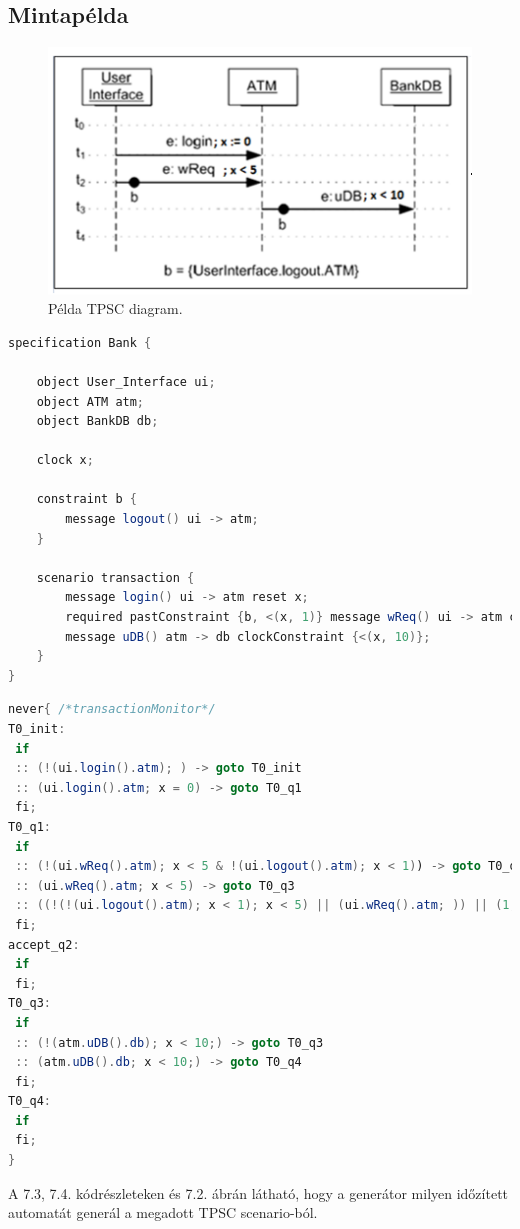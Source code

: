 \subsection{Mintapélda}

\begin{figure}[h!]
    \centering
    \includegraphics[width=130mm, keepaspectratio]{figures/14abra.png}
    \caption{Példa TPSC diagram.}
\end{figure}

\begin{lstlisting}[language=java,frame=single, float=h!, caption={TPSC scenario szöveges leírása.},captionpos=b]
specification Bank {

	object User_Interface ui;
	object ATM atm;
	object BankDB db;

	clock x;

	constraint b {
		message logout() ui -> atm;
	}

	scenario transaction {
		message login() ui -> atm reset x;
		required pastConstraint {b, <(x, 1)} message wReq() ui -> atm clockConstraint {<(x, 5)};
		message uDB() atm -> db clockConstraint {<(x, 10)};
	}
}
\end{lstlisting}

\begin{lstlisting}[language=java,frame=single, float=h!, caption={Generált időzített automata never claim formátumban.},captionpos=b]
never{ /*transactionMonitor*/
T0_init:
 if
 :: (!(ui.login().atm); ) -> goto T0_init
 :: (ui.login().atm; x = 0) -> goto T0_q1
 fi;
T0_q1:
 if
 :: (!(ui.wReq().atm); x < 5 & !(ui.logout().atm); x < 1)) -> goto T0_q1
 :: (ui.wReq().atm; x < 5) -> goto T0_q3
 :: ((!(!(ui.logout().atm); x < 1); x < 5) || (ui.wReq().atm; )) || (1, x >= 5))) -> goto accept_q2
 fi;
accept_q2:
 if
 fi;
T0_q3:
 if
 :: (!(atm.uDB().db); x < 10;) -> goto T0_q3
 :: (atm.uDB().db; x < 10;) -> goto T0_q4
 fi;
T0_q4:
 if
 fi;
}
\end{lstlisting}

A 7.3, 7.4. kódrészleteken és 7.2. ábrán látható, hogy a generátor milyen időzített automatát generál a megadott TPSC scenario-ból.